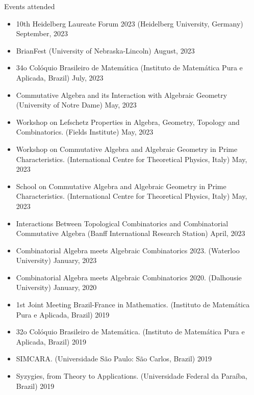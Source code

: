 \documentclass{resume} %
\begin{document}


\begin{rSection}{Events attended}

    \begin{itemize}[label={}]
        \item 10th Heidelberg Laureate Forum 2023 (Heidelberg University, Germany) September, 2023
        \item BrianFest (University of Nebraska-Lincoln) August, 2023
        \item 34o Colóquio Brasileiro de Matemática (Instituto de Matemática Pura e Aplicada, Brazil) July, 2023
        \item Commutative Algebra and its Interaction with Algebraic Geometry (University of Notre Dame) May, 2023
        \item Workshop on Lefschetz Properties in Algebra, Geometry, Topology and Combinatorics. (Fields Institute) May, 2023
        \item Workshop on Commutative Algebra and Algebraic Geometry in Prime Characteristics. (International Centre for Theoretical Physics, Italy) May, 2023
        \item School on Commutative Algebra and Algebraic Geometry in Prime Characteristics. (International Centre for Theoretical Physics, Italy) May, 2023
        \item Interactions Between Topological Combinatorics and Combinatorial Commutative Algebra (Banff International Research Station) April, 2023
        \item Combinatorial Algebra meets Algebraic Combinatorics 2023. (Waterloo University) January, 2023
        \item Combinatorial Algebra meets Algebraic Combinatorics 2020. (Dalhousie University) January, 2020
        \item 1st Joint Meeting Brazil-France in Mathematics. (Instituto de Matemática Pura e Aplicada, Brazil) 2019
        \item 32o Colóquio Brasileiro de Matemática. (Instituto de Matemática Pura e Aplicada, Brazil) 2019
        \item SIMCARA. (Universidade São Paulo: São Carlos, Brazil) 2019
        \item Syzygies, from Theory to Applications. (Universidade Federal da Paraíba, Brazil) 2019

\end{itemize}
\end{rSection}
\end{document}

